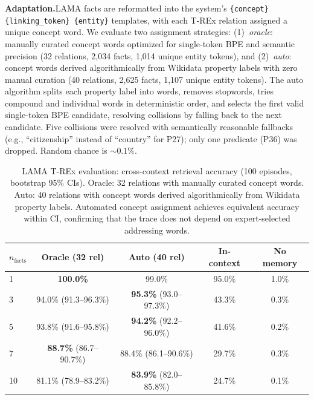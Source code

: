 \documentclass[11pt,a4paper]{article}
\begin{document}
\textbf{Adaptation.}\quad LAMA facts are reformatted into the system's \texttt{\{concept\} \{linking\_token\} \{entity\}} templates, with each T-REx relation assigned a unique concept word. We evaluate two assignment strategies: (1)~\emph{oracle}: manually curated concept words optimized for single-token BPE and semantic precision (32 relations, 2,034 facts, 1,014 unique entity tokens), and (2)~\emph{auto}: concept words derived algorithmically from Wikidata property labels with zero manual curation (40 relations, 2,625 facts, 1,107 unique entity tokens). The auto algorithm splits each property label into words, removes stopwords, tries compound and individual words in deterministic order, and selects the first valid single-token BPE candidate, resolving collisions by falling back to the next candidate. Five collisions were resolved with semantically reasonable fallbacks (e.g., ``citizenship'' instead of ``country'' for P27); only one predicate (P36) was dropped. Random chance is ${\sim}0.1\%$.

\begin{table}[t]
  \centering
  \caption{LAMA T-REx evaluation: cross-context retrieval accuracy (100 episodes, bootstrap 95\% CIs). Oracle: 32 relations with manually curated concept words. Auto: 40 relations with concept words derived algorithmically from Wikidata property labels. Automated concept assignment achieves equivalent accuracy within CI, confirming that the trace does not depend on expert-selected addressing words.}
  \label{tab:lama}
  \begin{tabular}{@{}lcccc@{}}
    \toprule
    $n_{\text{facts}}$ & Oracle (32 rel) & Auto (40 rel) & In-context & No memory \\
    \midrule
    1  & \textbf{100.0\%}               & 99.0\%                      & 95.0\%  & 1.0\% \\
    3  & 94.0\% (91.3--96.3\%)          & \textbf{95.3\%} (93.0--97.3\%)  & 43.3\%  & 0.3\% \\
    5  & 93.8\% (91.6--95.8\%)          & \textbf{94.2\%} (92.2--96.0\%)  & 41.6\%  & 0.2\% \\
    7  & \textbf{88.7\%} (86.7--90.7\%) & 88.4\% (86.1--90.6\%)           & 29.7\%  & 0.3\% \\
    10 & 81.1\% (78.9--83.2\%)          & \textbf{83.9\%} (82.0--85.8\%)  & 24.7\%  & 0.1\% \\
    \bottomrule
  \end{tabular}
\end{table}
\end{document}
